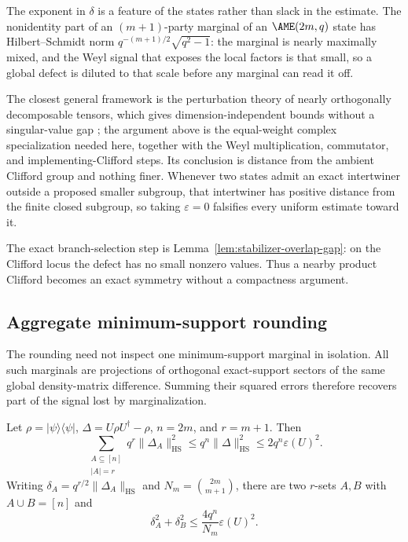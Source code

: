 The exponent in \(\delta\) is a feature of the states rather than slack in
the estimate.  The nonidentity part of an \((m+1)\)-party marginal of an
\(\AME(2m,q)\) state has Hilbert--Schmidt norm
\(q^{-(m+1)/2}\sqrt{q^2-1}\): the marginal is nearly maximally mixed, and
the Weyl signal that exposes the local factors is that small, so a global
defect is diluted to that scale before any marginal can read it off.

The closest general framework is the perturbation theory of nearly
orthogonally decomposable tensors, which gives dimension-independent bounds
without a singular-value gap \cite{AuddyYuan2020}; the argument above is
the equal-weight complex specialization needed here, together with the
Weyl multiplication, commutator, and implementing-Clifford steps.  Its
conclusion is distance from the ambient Clifford group and nothing finer.
Whenever two states admit an exact intertwiner outside a proposed smaller
subgroup, that intertwiner has positive distance from the finite closed
subgroup, so taking \(\varepsilon=0\) falsifies every uniform estimate
toward it.

The exact branch-selection step is Lemma~\ref{lem:stabilizer-overlap-gap}:
on the Clifford locus the defect has no small nonzero values.  Thus a nearby
product Clifford becomes an exact symmetry without a compactness argument.

\subsection{Aggregate minimum-support rounding}

The rounding need not inspect one minimum-support marginal in isolation.
All such marginals are projections of orthogonal exact-support sectors of
the same global density-matrix difference.  Summing their squared errors
therefore recovers part of the signal lost by marginalization.

\begin{lemma}
\label{lem:collective-support-energy}
Let \(\rho=\lvert\psi\rangle\langle\psi\rvert\),
\(\Delta=U\rho U^\dagger-\rho\), \(n=2m\), and \(r=m+1\).  Then
\[
 \sum_{\substack{A\subseteq[n]\\|A|=r}}
 q^r\lVert\Delta_A\rVert_{\mathrm{HS}}^2
 \leq q^n\lVert\Delta\rVert_{\mathrm{HS}}^2
 \leq2q^n\varepsilon(U)^2.                       \tag{B.7}
\]
Writing \(\delta_A=q^{r/2}\lVert\Delta_A\rVert_{\mathrm{HS}}\) and
\(N_m=\binom{2m}{m+1}\), there are two \(r\)-sets \(A,B\) with
\(A\cup B=[n]\) and
\[
 \delta_A^2+\delta_B^2
 \leq \frac{4q^n}{N_m}\varepsilon(U)^2.          \tag{B.8}
\]
\end{lemma}

